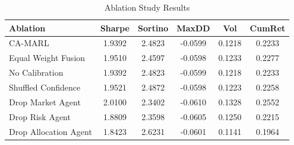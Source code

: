 \begin{table}[t]
\centering
\caption{Ablation Study Results}
\label{tab:ablation}
\begin{tabular}{lccccc}
\toprule
Ablation & Sharpe & Sortino & MaxDD & Vol & CumRet \\
\midrule
  CA-MARL & 1.9392 & 2.4823 & -0.0599 & 0.1218 & 0.2233 \\
  Equal Weight Fusion & 1.9510 & 2.4597 & -0.0598 & 0.1233 & 0.2277 \\
  No Calibration & 1.9392 & 2.4823 & -0.0599 & 0.1218 & 0.2233 \\
  Shuffled Confidence & 1.9521 & 2.4872 & -0.0598 & 0.1223 & 0.2258 \\
  Drop Market Agent & 2.0100 & 2.3402 & -0.0610 & 0.1328 & 0.2552 \\
  Drop Risk Agent & 1.8809 & 2.3598 & -0.0605 & 0.1250 & 0.2215 \\
  Drop Allocation Agent & 1.8423 & 2.6231 & -0.0601 & 0.1141 & 0.1964 \\
\bottomrule
\end{tabular}
\end{table}